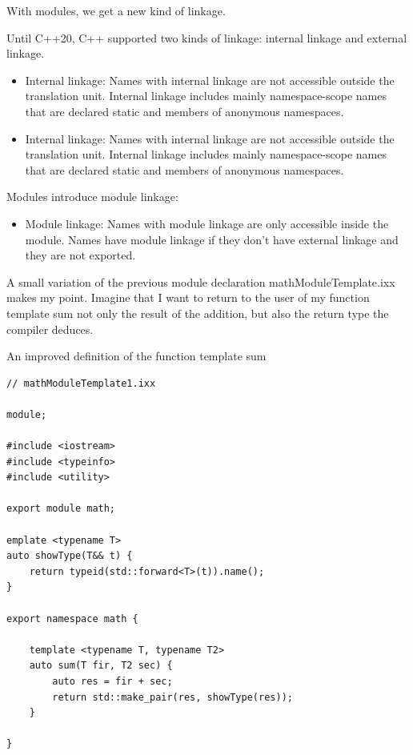 With modules, we get a new kind of linkage.


Until C++20, C++ supported two kinds of linkage: internal linkage and external linkage.

\begin{itemize}
\item 
Internal linkage: Names with internal linkage are not accessible outside the translation unit. Internal linkage includes mainly namespace-scope names that are declared static and members of anonymous namespaces.

\item 
Internal linkage: Names with internal linkage are not accessible outside the translation unit. Internal linkage includes mainly namespace-scope names that are declared static and members of anonymous namespaces.
\end{itemize}

Modules introduce module linkage:

\begin{itemize}
\item 
Module linkage: Names with module linkage are only accessible inside the module. Names have module linkage if they don’t have external linkage and they are not exported.
\end{itemize}

A small variation of the previous module declaration mathModuleTemplate.ixx makes my point. Imagine that I want to return to the user of my function template sum not only the result of the addition, but also the return type the compiler deduces.

\noindent
An improved definition of the function template sum
\begin{lstlisting}[style=styleCXX]
// mathModuleTemplate1.ixx

module;

#include <iostream>
#include <typeinfo>
#include <utility>

export module math;

emplate <typename T>
auto showType(T&& t) {
	return typeid(std::forward<T>(t)).name();
}

export namespace math {

	template <typename T, typename T2>
	auto sum(T fir, T2 sec) {
		auto res = fir + sec;
		return std::make_pair(res, showType(res));
	}

}
\end{lstlisting}

